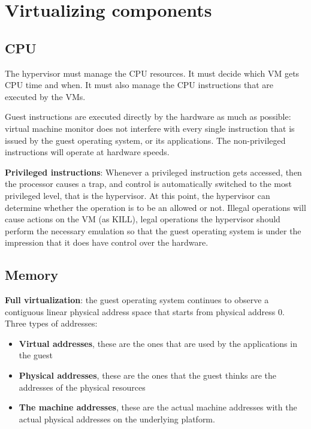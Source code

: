 \section{Virtualizing components}

\subsection{CPU}

The hypervisor must manage the CPU resources. It must decide which VM gets CPU time and when. It must also manage the CPU instructions that are executed by the VMs.

Guest instructions are executed directly by the hardware as much as
possible: virtual machine monitor does not interfere with every single
instruction that is issued by the guest operating system, or its applications.
The non-privileged instructions will operate at hardware speeds.

\textbf{Privileged instructions}: Whenever a privileged instruction gets accessed,
then the processor causes a trap, and control is automatically switched to
the most privileged level, that is the hypervisor. At this point, the
hypervisor can determine whether the operation is to be an allowed or
not. Illegal operations will cause actions on the VM (as KILL), legal
operations the hypervisor should perform the necessary emulation so
that the guest operating system is under the impression that it does have
control over the hardware.

\subsection{Memory}

\textbf{Full virtualization}: the guest operating system continues to observe a
contiguous linear physical address space that starts from physical
address 0.
Three types of addresses:
\begin{itemize}
    \item \textbf{Virtual addresses}, these are the ones that are used by the applications in the guest
    \item \textbf{Physical addresses}, these are the ones that the guest thinks are the addresses of the physical resources 
    \item \textbf{The machine addresses}, these are the actual machine addresses with the actual physical addresses on the underlying platform. 
\end{itemize}

